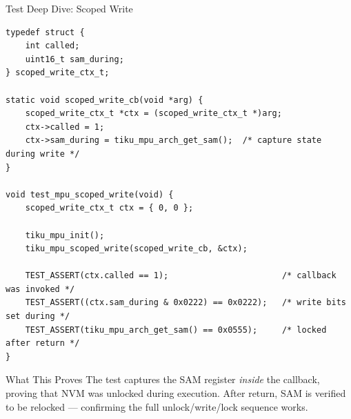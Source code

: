 \documentclass[aspectratio=169, 10pt]{beamer}
\begin{document}
\begin{frame}[fragile]{Test Deep Dive: Scoped Write}
\begin{lstlisting}[style=cstyle, title={test\_mem\_mpu.c --- Scoped write test}]
typedef struct {
    int called;
    uint16_t sam_during;
} scoped_write_ctx_t;

static void scoped_write_cb(void *arg) {
    scoped_write_ctx_t *ctx = (scoped_write_ctx_t *)arg;
    ctx->called = 1;
    ctx->sam_during = tiku_mpu_arch_get_sam();  /* capture state during write */
}

void test_mpu_scoped_write(void) {
    scoped_write_ctx_t ctx = { 0, 0 };

    tiku_mpu_init();
    tiku_mpu_scoped_write(scoped_write_cb, &ctx);

    TEST_ASSERT(ctx.called == 1);                       /* callback was invoked */
    TEST_ASSERT((ctx.sam_during & 0x0222) == 0x0222);   /* write bits set during */
    TEST_ASSERT(tiku_mpu_arch_get_sam() == 0x0555);     /* locked after return */
}
\end{lstlisting}

\vspace{0.3em}
\begin{block}{What This Proves}
The test captures the SAM register \emph{inside} the callback, proving
that NVM was unlocked during execution. After return, SAM is verified
to be relocked --- confirming the full unlock/write/lock sequence works.
\end{block}
\end{frame}
\end{document}

